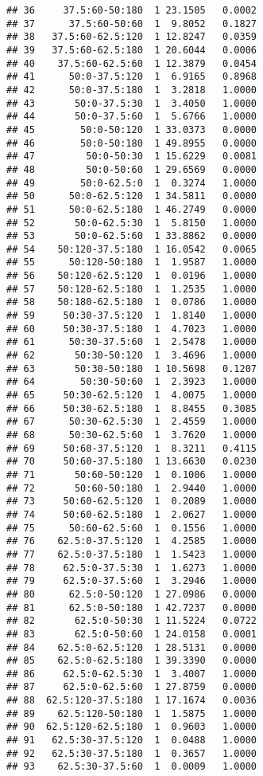\begin{knitrout}
\begin{kframe}
\begin{verbatim}
## 36     37.5:60-50:180  1 23.1505   0.0002
## 37      37.5:60-50:60  1  9.8052   0.1827
## 38   37.5:60-62.5:120  1 12.8247   0.0359
## 39   37.5:60-62.5:180  1 20.6044   0.0006
## 40    37.5:60-62.5:60  1 12.3879   0.0454
## 41      50:0-37.5:120  1  6.9165   0.8968
## 42      50:0-37.5:180  1  3.2818   1.0000
## 43       50:0-37.5:30  1  3.4050   1.0000
## 44       50:0-37.5:60  1  5.6766   1.0000
## 45        50:0-50:120  1 33.0373   0.0000
## 46        50:0-50:180  1 49.8955   0.0000
## 47         50:0-50:30  1 15.6229   0.0081
## 48         50:0-50:60  1 29.6569   0.0000
## 49        50:0-62.5:0  1  0.3274   1.0000
## 50      50:0-62.5:120  1 34.5811   0.0000
## 51      50:0-62.5:180  1 46.2749   0.0000
## 52       50:0-62.5:30  1  5.8150   1.0000
## 53       50:0-62.5:60  1 33.8862   0.0000
## 54    50:120-37.5:180  1 16.0542   0.0065
## 55      50:120-50:180  1  1.9587   1.0000
## 56    50:120-62.5:120  1  0.0196   1.0000
## 57    50:120-62.5:180  1  1.2535   1.0000
## 58    50:180-62.5:180  1  0.0786   1.0000
## 59     50:30-37.5:120  1  1.8140   1.0000
## 60     50:30-37.5:180  1  4.7023   1.0000
## 61      50:30-37.5:60  1  2.5478   1.0000
## 62       50:30-50:120  1  3.4696   1.0000
## 63       50:30-50:180  1 10.5698   0.1207
## 64        50:30-50:60  1  2.3923   1.0000
## 65     50:30-62.5:120  1  4.0075   1.0000
## 66     50:30-62.5:180  1  8.8455   0.3085
## 67      50:30-62.5:30  1  2.4559   1.0000
## 68      50:30-62.5:60  1  3.7620   1.0000
## 69     50:60-37.5:120  1  8.3211   0.4115
## 70     50:60-37.5:180  1 13.6630   0.0230
## 71       50:60-50:120  1  0.1006   1.0000
## 72       50:60-50:180  1  2.9440   1.0000
## 73     50:60-62.5:120  1  0.2089   1.0000
## 74     50:60-62.5:180  1  2.0627   1.0000
## 75      50:60-62.5:60  1  0.1556   1.0000
## 76    62.5:0-37.5:120  1  4.2585   1.0000
## 77    62.5:0-37.5:180  1  1.5423   1.0000
## 78     62.5:0-37.5:30  1  1.6273   1.0000
## 79     62.5:0-37.5:60  1  3.2946   1.0000
## 80      62.5:0-50:120  1 27.0986   0.0000
## 81      62.5:0-50:180  1 42.7237   0.0000
## 82       62.5:0-50:30  1 11.5224   0.0722
## 83       62.5:0-50:60  1 24.0158   0.0001
## 84    62.5:0-62.5:120  1 28.5131   0.0000
## 85    62.5:0-62.5:180  1 39.3390   0.0000
## 86     62.5:0-62.5:30  1  3.4007   1.0000
## 87     62.5:0-62.5:60  1 27.8759   0.0000
## 88  62.5:120-37.5:180  1 17.1674   0.0036
## 89    62.5:120-50:180  1  1.5875   1.0000
## 90  62.5:120-62.5:180  1  0.9603   1.0000
## 91   62.5:30-37.5:120  1  0.0488   1.0000
## 92   62.5:30-37.5:180  1  0.3657   1.0000
## 93    62.5:30-37.5:60  1  0.0009   1.0000

\end{verbatim}
\end{kframe}
\end{knitrout}
